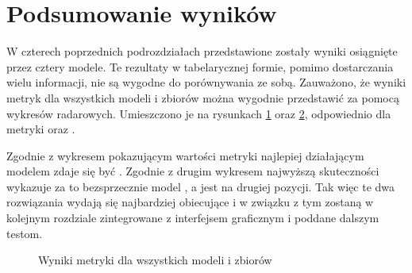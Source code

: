 \section{Podsumowanie wyników}
W czterech poprzednich podrozdziałach przedstawione zostały wyniki osiągnięte przez cztery modele. Te rezultaty w tabelarycznej formie, pomimo dostarczania wielu informacji, nie są wygodne do porównywania ze sobą. Zauważono, że wyniki metryk dla wszystkich modeli i zbiorów można wygodnie przedstawić za pomocą wykresów radarowych. Umieszczono je na rysunkach \ref{fig:experiments-em} oraz \ref{fig:experiments-ex}, odpowiednio dla metryki  oraz .

Zgodnie z wykresem pokazującym wartości metryki  najlepiej działającym modelem zdaje się być . Zgodnie z drugim wykresem najwyższą skuteczności wykazuje za to bezsprzecznie model , a  jest na drugiej pozycji. Tak więc te dwa rozwiązania wydają się najbardziej obiecujące i w związku z tym zostaną w kolejnym rozdziale zintegrowane z interfejsem graficznym i poddane dalszym testom.

\begin{figure}[H]
  \centering
  
  \caption{Wyniki metryki  dla wszystkich modeli i zbiorów}
  \label{fig:experiments-em}
\end{figure}

\begin{figure}[H]
  \centering
  
  \label{fig:experiments-ex}
\end{figure}
